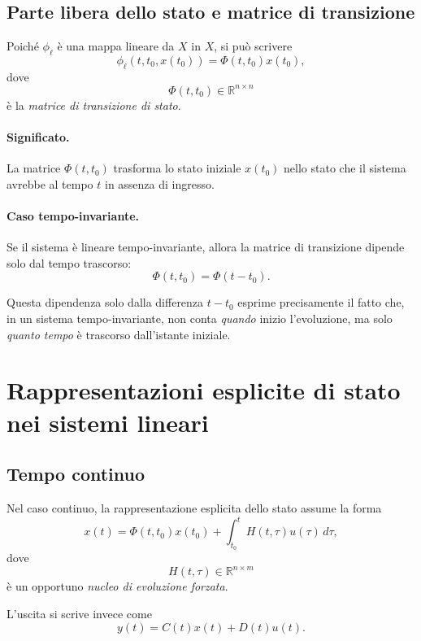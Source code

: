 \subsection{Parte libera dello stato e matrice di transizione}

Poiché $\phi_\ell$ è una mappa lineare da $X$ in $X$, si può scrivere
\[
\phi_\ell(t,t_0,x(t_0))=\Phi(t,t_0)x(t_0),
\]
dove
\[
\Phi(t,t_0)\in\mathbb{R}^{n\times n}
\]
è la \emph{matrice di transizione di stato}.

\paragraph{Significato.}
La matrice $\Phi(t,t_0)$ trasforma lo stato iniziale $x(t_0)$ nello stato che il sistema avrebbe al tempo $t$ in assenza di ingresso.

\paragraph{Caso tempo-invariante.}
Se il sistema è lineare tempo-invariante, allora la matrice di transizione dipende solo dal tempo trascorso:
\[
\Phi(t,t_0)=\Phi(t-t_0).
\]

Questa dipendenza solo dalla differenza $t-t_0$ esprime precisamente il fatto che, in un sistema tempo-invariante, non conta \emph{quando} inizio l'evoluzione, ma solo \emph{quanto tempo} è trascorso dall'istante iniziale.

\section{Rappresentazioni esplicite di stato nei sistemi lineari}

\subsection{Tempo continuo}

Nel caso continuo, la rappresentazione esplicita dello stato assume la forma
\begin{equation}
x(t)=\Phi(t,t_0)x(t_0)+\int_{t_0}^{t} H(t,\tau)u(\tau)\,d\tau,
\label{eq:L3_explicit_TC}
\end{equation}
dove
\[
H(t,\tau)\in\mathbb{R}^{n\times m}
\]
è un opportuno \emph{nucleo di evoluzione forzata}.

L'uscita si scrive invece come
\begin{equation}
y(t)=C(t)x(t)+D(t)u(t).
\label{eq:L3_TC_output}
\end{equation}

